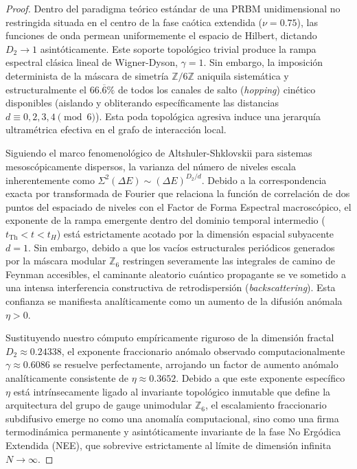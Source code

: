 \documentclass[aps,prl,preprint,superscriptaddress,floatfix]{revtex4-2}
\newcommand{\Z}{\mathbb{Z}}
\newcommand{\Zmod}{\mathbb{Z}/6\mathbb{Z}}
\begin{document}
\begin{proof}
Dentro del paradigma teórico estándar de una PRBM unidimensional no restringida situada en el centro de la fase caótica extendida ($\nu=0.75$), las funciones de onda permean uniformemente el espacio de Hilbert, dictando $D_2 \to 1$ asintóticamente. Este soporte topológico trivial produce la rampa espectral clásica lineal de Wigner-Dyson, $\gamma = 1$. Sin embargo, la imposición determinista de la máscara de simetría $\Zmod$ aniquila sistemática y estructuralmente el $66.\overline{6}\%$ de todos los canales de salto (\textit{hopping}) cinético disponibles (aislando y obliterando específicamente las distancias $d \equiv 0, 2, 3, 4 \pmod 6$). Esta poda topológica agresiva induce una jerarquía ultramétrica efectiva en el grafo de interacción local. 

Siguiendo el marco fenomenológico de Altshuler-Shklovskii para sistemas mesoscópicamente dispersos, la varianza del número de niveles escala inherentemente como $\Sigma^2(\Delta E) \sim (\Delta E)^{D_2/d}$. Debido a la correspondencia exacta por transformada de Fourier que relaciona la función de correlación de dos puntos del espaciado de niveles con el Factor de Forma Espectral macroscópico, el exponente de la rampa emergente dentro del dominio temporal intermedio ($t_{\text{Th}} < t < t_H$) está estrictamente acotado por la dimensión espacial subyacente $d=1$. Sin embargo, debido a que los vacíos estructurales periódicos generados por la máscara modular $\Z_6$ restringen severamente las integrales de camino de Feynman accesibles, el caminante aleatorio cuántico propagante se ve sometido a una intensa interferencia constructiva de retrodispersión (\textit{backscattering}). Esta confianza se manifiesta analíticamente como un aumento de la difusión anómala $\eta > 0$. 

Sustituyendo nuestro cómputo empíricamente riguroso de la dimensión fractal $D_2 \approx 0.24338$, el exponente fraccionario anómalo observado computacionalmente $\gamma \approx 0.6086$ se resuelve perfectamente, arrojando un factor de aumento anómalo analíticamente consistente de $\eta \approx 0.3652$. Debido a que este exponente específico $\eta$ está intrínsecamente ligado al invariante topológico inmutable que define la arquitectura del grupo de gauge unimodular $\Z_6$, el escalamiento fraccionario subdifusivo emerge no como una anomalía computacional, sino como una firma termodinámica permanente y asintóticamente invariante de la fase No Ergódica Extendida (NEE), que sobrevive estrictamente al límite de dimensión infinita $N \to \infty$.
\end{proof}
\end{document}
